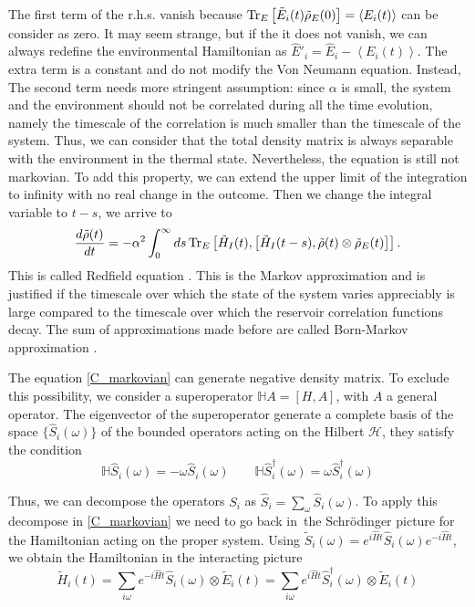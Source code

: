 The first term of the r.h.s. vanish because $ \operatorname{Tr}_E\left[\tilde E_i(t)\tilde\rho_E(0)\right] = \left<E_i(t)\right>$ can be consider as zero. 
It may seem strange, but if the it does not vanish, we can always redefine the environmental Hamiltonian as $\hat E'_i = \hat E_i - \left<E_i(t)\right>$. The extra term is a constant and do not modify the Von Neumann equation.
Instead, The second term needs more stringent assumption: since $\alpha$ is small, the system and the environment should not be correlated during all the time evolution, namely the timescale of the correlation is much smaller than the timescale of the system. Thus, we can consider that the total density matrix is always separable with the environment in the thermal state.
Nevertheless, the equation is still not markovian. To add this property, we can extend the upper limit of the integration to infinity with no real change in the outcome. Then we change the integral variable to $t - s$, we arrive to 
\begin{eqnarray}\label{C_markovian}
    \frac{d\tilde \rho(t)}{dt} = -\alpha^2 \int_0^\infty ds \operatorname{Tr}_E\left[\tilde H_I(t),\left[\tilde H_I(t-s),\tilde\rho(t)\otimes\tilde\rho_E(t)\right]\right].
\end{eqnarray}
This is called Redfield equation \cite{Redfield}.
This is the Markov approximation and is justified if the timescale over which the state of the system varies appreciably is large compared to the timescale over which the reservoir correlation functions decay. The sum of approximations made before are called Born-Markov approximation \cite{Breuer-Petruccione}.

The equation \eqref{C_markovian} can generate negative density matrix. To exclude this possibility, we consider a superoperator $\mathbb{H} A = \left[H,A\right]$, with $A$ a general operator. The eigenvector of the superoperator generate a complete basis of the space $\{\hat S_i(\omega)\}$ of the bounded operators acting on the Hilbert $\mathcal{H}$, they satisfy the condition
\begin{equation}
    \mathbb{H}\hat S_i(\omega) = -\omega \hat S_i(\omega) \qquad \mathbb{H}\hat S_i^\dagger(\omega) = \omega \hat S_i^\dagger(\omega)
\end{equation}

Thus, we can decompose the operators $S_i$ as $\hat S_i = \sum_\omega \hat S_i(\omega)$.
To apply this decompose in \eqref{C_markovian} we need to go back in\ the Schrödinger picture for the Hamiltonian acting on the proper system. Using $\tilde S_i(\omega)=e^{i\hat Ht}\hat S_i(\omega)e^{-i\hat H t}$, we obtain the Hamiltonian in the interacting picture
\begin{equation}\label{eigen_Hamiltonian}
    \tilde H_i(t) = \sum_{i\omega} e^{-i\hat Ht}\hat S_i(\omega) \otimes \tilde E_i (t)= \sum_{i\omega} e^{i\hat Ht}\hat S_i^\dagger(\omega) \otimes \tilde E_i (t)
\end{equation}

